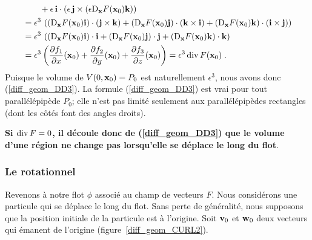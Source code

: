 {\begin{align*}
&\qquad + \epsilon\,\mathbf{i} \cdot \left(\epsilon\,\mathbf{j} \times
\left( \epsilon \mathrm{D}_{\mathbf{x}} F(\mathbf{x}_0) \mathbf{k}\right) \right) \\
&= \epsilon^3\, \left(
\left(\mathrm{D}_{\mathbf{x}} F(\mathbf{x}_0) \mathbf{i} \right)\cdot
\left(\mathbf{j} \times \mathbf{k} \right)
+ \left(\mathrm{D}_{\mathbf{x}} F(\mathbf{x}_0) \mathbf{j} \right)
\cdot \left(\mathbf{k} \times \mathbf{i} \right)
+ \left(\mathrm{D}_{\mathbf{x}}F(\mathbf{x}_0) \mathbf{k}\right) \cdot \left( \mathbf{i} \times
\mathbf{j} \right) \right) \\
&= \epsilon^3\, \left(
\left(\mathrm{D}_{\mathbf{x}} F(\mathbf{x}_0) \mathbf{i} \right) \cdot \mathbf{i}
+ \left(\mathrm{D}_{\mathbf{x}} F(\mathbf{x}_0) \mathbf{j} \right) \cdot \mathbf{j}
+ \left(\mathrm{D}_{\mathbf{x}} F(\mathbf{x}_0) \mathbf{k}\right) \cdot \mathbf{k} \right) \\
&= \epsilon^3  \left( \frac{\partial f_1}{\partial x}(\mathbf{x}_0) + \frac{\partial f_2}{\partial y}(\mathbf{x}_0)
+ \frac{\partial f_3}{\partial z}(\mathbf{x}_0) \right) = \epsilon^3 \operatorname{div} F(\mathbf{x}_0)
\; .
\end{align*}
Puisque le volume de $V(0,\mathbf{x}_0) = P_0$ est naturellement
$\epsilon^3$, nous avons donc (\ref{diff_geom_DD3}).  La formule
(\ref{diff_geom_DD3}) est vrai pour tout parallélépipède $P_0$; elle
n'est pas limité seulement aux parallélépipèdes rectangles (dont les
côtés font des angles droits).

{\bfseries Si $\operatorname{div} F = 0$, il découle donc de
(\ref{diff_geom_DD3}) que le volume d'une région ne change pas
lorsqu'elle se déplace le long du flot}.

\subsubsection{Le rotationnel}

Revenons à notre flot $\phi$ associé au champ de vecteurs $F$.
Nous considérons une particule qui se déplace le long du flot.  Sans perte
de généralité, nous supposons que la position initiale de la particule est
à l'origine.  Soit $\mathbf{v}_0$ et $\mathbf{w}_0$ deux vecteurs qui
émanent de l'origine (figure~\ref{diff_geom_CURL2}).


}
